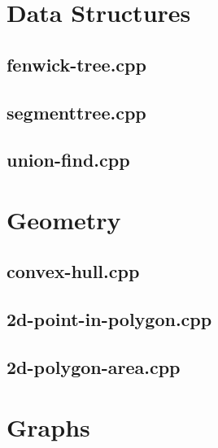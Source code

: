 \documentclass[10pt,twocolumn,landscape]{article}
\author{Make Programming Great Again™}
\begin{document}
\maketitle
\clearpage

\section{Data Structures}

\subsection{fenwick-tree.cpp}


\subsection{segmenttree.cpp}


\subsection{union-find.cpp}


\section{Geometry}

\subsection{convex-hull.cpp}


\subsection{2d-point-in-polygon.cpp}


\subsection{2d-polygon-area.cpp}


\section{Graphs}
\end{document}
